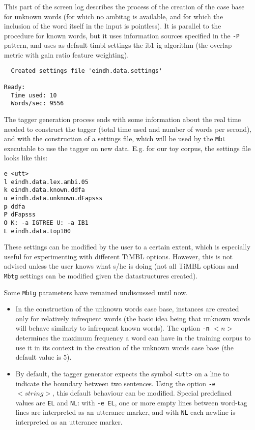 \documentclass{report}
\begin{document}
This part of the screen log describes the process of the creation of
the case base for unknown words (for which no ambitag is available,
and for which the inclusion of the word itself in the input is
pointless). It is parallel to the procedure for known words, but it
uses information sources specified in the {\tt -P} pattern, and uses
as default {\sc timbl} settings the {\sc ib1-ig} algorithm (the
overlap metric with gain ratio feature weighting).

{\small
\begin{verbatim}
  Created settings file 'eindh.data.settings'

Ready:
  Time used: 10
  Words/sec: 9556
\end{verbatim}
}

The tagger generation process ends with some information about the
real time needed to construct the tagger (total time used and number
of words per second), and with the construction of a settings file,
which will be used by the {\tt Mbt} executable to use the tagger on
new data. E.g. for our toy corpus, the settings file looks like this:

{\small
\begin{verbatim}
e <utt>
l eindh.data.lex.ambi.05
k eindh.data.known.ddfa
u eindh.data.unknown.dFapsss
p ddfa
P dFapsss
O K: -a IGTREE U: -a IB1
L eindh.data.top100
\end{verbatim}
}

These settings can be modified by the user to a certain extent, which
is especially useful for experimenting with different TiMBL
options. However, this is not advised unless the user knows what s/he
is doing (not all TiMBL options and {\tt Mbtg} settings can be
modified given the datastructures created).

Some {\tt Mbtg} parameters have remained undiscussed until now. 

\begin{itemize}
\item In the construction of the unknown words case base, instances
  are created only for relatively infrequent words
  (the basic idea being that unknown words will behave similarly to
  infrequent known words).  The option {\tt -n} $<n>$ determines the
  maximum frequency a word can have in the training corpus to use it
  in its context in the creation of the unknown words case base
  (the default value is 5).
\item By default, the tagger generator expects the symbol {\tt <utt>}
  on a line to indicate the boundary between two sentences.  Using the
  option {\tt -e} $<string>$, this default behaviour can be
  modified. Special predefined values are {\tt EL} and {\tt NL}: with
  {\tt -e EL}, one or more empty lines between word-tag lines are
  interpreted as an utterance marker, and with {\tt NL} each newline
  is interpreted as an utterance marker.
\end{itemize}
\end{document}

